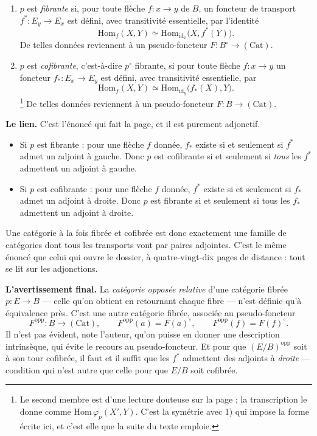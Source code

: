 \documentclass[11pt,a4paper]{article}
\begin{document}
\begin{enumerate}
\item[1)] $p$ est \emph{fibrante} si, pour toute flèche $f : x \to y$ de $B$,
un foncteur de transport $f^{*} : E_{y} \to E_{x}$ est défini, avec
transitivité essentielle, par l'identité
\[
  \mathrm{Hom}_{f}(X, Y) \simeq
  \mathrm{Hom}_{\mathrm{id}_{x}}\bigl( X, f^{*}(Y) \bigr) .
\]
De telles données reviennent à un pseudo-foncteur $F : B^{\circ} \to
(\mathrm{Cat})$.
\item[2)] $p$ est \emph{cofibrante}, c'est-à-dire $p^{\circ}$ fibrante, si pour
toute flèche $f : x \to y$ un foncteur $f_{*} : E_{x} \to E_{y}$ est défini,
avec transitivité essentielle, par
\[
  \mathrm{Hom}_{f}(X, Y) \simeq
  \mathrm{Hom}_{\mathrm{id}_{y}}\bigl( f_{*}(X), Y \bigr) .
\]
\footnote{Le second membre est d'une lecture douteuse sur la page ; la
transcription le donne comme $\mathrm{Hom}\,\varphi_{p}(X', Y)$. C'est la
symétrie avec 1) qui impose la forme écrite ici, et c'est elle que la suite du
texte emploie.}
De telles données reviennent à un pseudo-foncteur $F : B \to (\mathrm{Cat})$.
\end{enumerate}


\textbf{Le lien.} C'est l'énoncé qui fait la page, et il est purement
adjonctif.

\begin{itemize}
\item Si $p$ est fibrante : pour une flèche $f$ donnée, $f_{*}$ existe si et
seulement si $f^{*}$ admet un adjoint à gauche. Donc $p$ est cofibrante si et
seulement si \emph{tous} les $f^{*}$ admettent un adjoint à gauche.
\item Si $p$ est cofibrante : pour une flèche $f$ donnée, $f^{*}$ existe si et
seulement si $f_{*}$ admet un adjoint à droite. Donc $p$ est fibrante si et
seulement si tous les $f_{*}$ admettent un adjoint à droite.
\end{itemize}

Une catégorie à la fois fibrée et cofibrée est donc exactement une famille de
catégories dont tous les transports vont par paires adjointes. C'est le même
énoncé que celui qui ouvre le dossier, à quatre-vingt-dix pages de distance :
tout se lit sur les adjonctions.


\textbf{L'avertissement final.} La \emph{catégorie opposée relative} d'une
catégorie fibrée $p : E \to B$ — celle qu'on obtient en retournant chaque
fibre — n'est définie qu'à équivalence près. C'est une autre catégorie fibrée,
associée au pseudo-foncteur
\[
  F^{\mathrm{opp}} : B \longrightarrow (\mathrm{Cat}) , \qquad
  F^{\mathrm{opp}}(a) = F(a)^{\circ} , \qquad
  F^{\mathrm{opp}}(f) = F(f)^{\circ} .
\]
Il n'est pas évident, note l'auteur, qu'on puisse en donner une description
intrinsèque, qui évite le recours au pseudo-foncteur. Et pour que
$(E/B)^{\mathrm{opp}}$ soit à son tour cofibrée, il faut et il suffit que les
$f^{*}$ admettent des adjoints à \emph{droite} — condition qui n'est autre que
celle pour que $E/B$ soit cofibrée.
\end{document}
